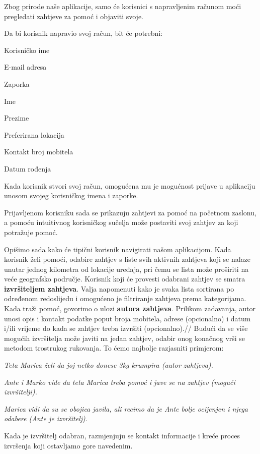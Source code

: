 Zbog prirode naše aplikacije, samo će korisnici s napravljenim računom moći pregledati zahtjeve za pomoć i objaviti svoje.

\pagebreak
 Da bi korisnik napravio svoj račun, bit će potrebni:

\begin{packed_item}
	\item Korisničko ime
	\item E-mail adresa
	\item Zaporka
	\item Ime
	\item Prezime
	\item Preferirana lokacija
	\item Kontakt broj mobitela
	\item Datum rođenja
\end{packed_item}

Kada korisnik stvori svoj račun, omogućena mu je mogućnost prijave u aplikaciju unosom svojeg korisničkog imena i zaporke.

Prijavljenom korisniku sada se prikazuju zahtjevi za pomoć na početnom zaslonu, a pomoću intuitivnog korisničkog sučelja može postaviti svoj zahtjev za koji potražuje pomoć.

Opišimo sada kako će tipični korisnik navigirati našom aplikacijom.
Kada korisnik želi pomoći, odabire zahtjev s liste svih aktivnih zahtjeva
koji se nalaze unutar jednog kilometra od lokacije uređaja, pri čemu se lista može
proširiti na veće geografsko područje. Korisnik koji će provesti odabrani zahtjev
se smatra \textbf{izvršiteljem zahtjeva}. Valja napomenuti kako je svaka lista sortirana po određenom redoslijedu i omogućeno je
filtriranje zahtjeva prema kategorijama.\\
Kada traži pomoć, govorimo o ulozi \textbf{autora zahtjeva}. Prilikom zadavanja, autor unosi opis i kontakt podatke poput broja mobitela, adrese (opcionalno) i datum i/ili vrijeme do kada se zahtjev treba izvršiti (opcionalno).//
Budući da se više mogućih izvršitelja može javiti na jedan zahtjev, odabir onog konačnog vrši se metodom trostrukog rukovanja. To ćemo najbolje razjasniti primjerom: 

	\begin{packed_item}
	\item \textit {Teta Marica želi da joj netko donese 3kg krumpira (autor zahtjeva).}
	
	\item \textit {Ante i Marko vide da teta Marica treba pomoć i jave se na zahtjev (mogući izvršitelji).}
	\item \textit {Marica vidi da su se obojica javila, ali recimo da je Ante bolje ocijenjen i njega odabere (Ante je izvršitelj).}
	\end{packed_item}
	Kada je izvršitelj odabran, razmjenjuju se kontakt informacije i kreće proces izvršenja koji ostavljamo gore navedenim.
	
